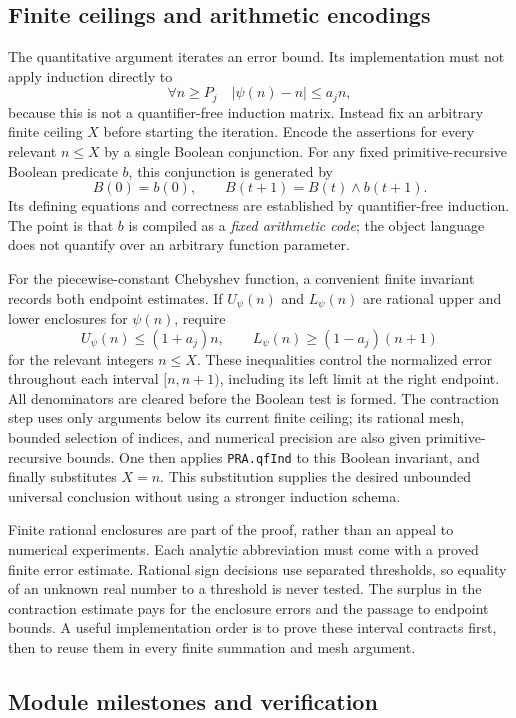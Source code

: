 \subsection{Finite ceilings and arithmetic encodings}

The quantitative argument iterates an error bound.  Its implementation
must not apply induction directly to
\[
 \forall n\geq P_j\quad |\psi(n)-n|\leq a_j n,
\]
because this is not a quantifier-free induction matrix.  Instead fix an
arbitrary finite ceiling $X$ before starting the iteration.  Encode the
assertions for every relevant $n\leq X$ by a single Boolean conjunction.
For any fixed primitive-recursive Boolean predicate $b$, this conjunction
is generated by
\[
 B(0)=b(0),\qquad B(t+1)=B(t)\wedge b(t+1).
\]
Its defining equations and correctness are established by quantifier-free
induction.  The point is that $b$ is compiled as a \emph{fixed arithmetic
code}; the object language does not quantify over an arbitrary function
parameter.

For the piecewise-constant Chebyshev function, a convenient finite
invariant records both endpoint estimates.  If $U_\psi(n)$ and
$L_\psi(n)$ are rational upper and lower enclosures for $\psi(n)$, require
\[
 U_\psi(n)\leq(1+a_j)n,
 \qquad
 L_\psi(n)\geq(1-a_j)(n+1)
\]
for the relevant integers $n\leq X$.  These inequalities control the
normalized error throughout each interval $[n,n+1)$, including its left
limit at the right endpoint.  All denominators are cleared before the
Boolean test is formed.  The contraction step uses only arguments below
its current finite ceiling; its rational mesh, bounded selection of
indices, and numerical precision are also given primitive-recursive
bounds.  One then applies \texttt{PRA.qfInd} to this Boolean invariant,
and finally substitutes $X=n$.  This substitution supplies the desired
unbounded universal conclusion without using a stronger induction schema.

Finite rational enclosures are part of the proof, rather than an appeal
to numerical experiments.  Each analytic abbreviation must come with a
proved finite error estimate.  Rational sign decisions use separated
thresholds, so equality of an unknown real number to a threshold is never
tested.  The surplus in the contraction estimate pays for the enclosure
errors and the passage to endpoint bounds.  A useful implementation order
is to prove these interval contracts first, then to reuse them in every
finite summation and mesh argument.

\subsection{Module milestones and verification}

